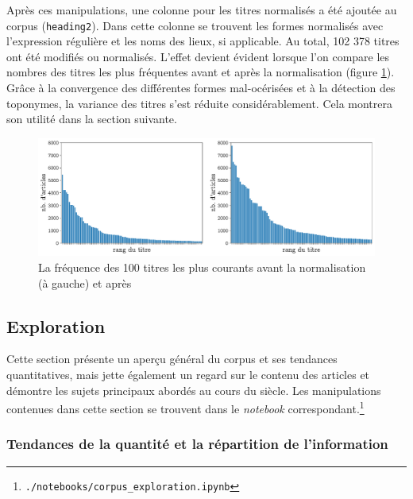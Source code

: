 \documentclass[a4paper,twoside,12pt]{article}
\begin{document}
Après ces manipulations, une colonne pour les titres normalisés a été ajoutée au corpus (\texttt{heading2}). Dans cette colonne se trouvent les formes normalisés avec l'expression régulière et les noms des lieux, si applicable. Au total, 102 378 titres ont été modifiés ou normalisés. L'effet devient évident lorsque l'on compare les nombres des titres les plus fréquentes avant et après la normalisation (figure \ref{fig:title_normalisation}). Grâce à la convergence des différentes formes mal-océrisées et à la détection des toponymes, la variance des titres s'est réduite considérablement. Cela montrera son utilité dans la section suivante.

\begin{figure}[h]
\centering
\captionsetup{justification=centering}
\includegraphics[width=\textwidth]{images/title_normalisation.pdf}
\caption{La fréquence des 100 titres les plus courants avant la normalisation (à gauche) et après}
\label{fig:title_normalisation}
\end{figure}




\subsection{Exploration} \label{exploration}

Cette section présente un aperçu général du corpus et ses tendances quantitatives, mais jette également un regard sur le contenu des articles et démontre les sujets principaux abordés au cours du siècle. Les manipulations contenues dans cette section se trouvent dans le \textit{notebook} correspondant.\footnote{\texttt{./notebooks/corpus\_exploration.ipynb}}

\subsubsection{Tendances de la quantité et la répartition de l'information} \label{corpus_tendencies}
\end{document}
